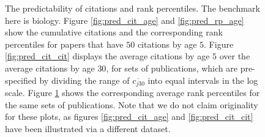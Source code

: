 \begin{figure}
\begin{subfigure}[b]{0.48\textwidth}
         \caption{}
         \label{fig:pred_rp_rp}
     \end{subfigure}
        \caption{The predictability of citations and rank percentiles. The benchmark here is biology. Figure \ref{fig:pred_cit_age} and \ref{fig:pred_rp_age} show the cumulative citations and the corresponding rank percentiles for papers that have $50$ citations by age $5$. Figure \ref{fig:pred_cit_cit} displays the average citations by age $5$ over the average citations by age $30$, for sets of publications, which are pre-specified by dividing the range of $\overline{c_{j 30}}$ into equal intervals in the log scale. Figure \ref{fig:pred_rp_rp} shows the corresponding average rank percentiles for the same sets of publications. Note that we do not claim originality for these plots, as figures \ref{fig:pred_cit_age} and \ref{fig:pred_cit_cit} have been illustrated via a different dataset\supercite{Wang2013}.}
        \label{fig:pub_cit_rp_pred}
\end{figure}


